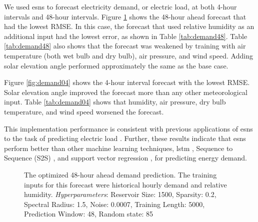 We used \glspl{esn} to forecast electricity demand, or electric load, at both
4-hour intervals and 48-hour intervals. Figure \ref{fig:48demand} shows the
48-hour ahead forecast that had the lowest RMSE. In this case, the forecast
that used relative humidity as an additional input had the lowest error, as
shown in Table \ref{tab:demand48}. Table \ref{tab:demand48} also shows that the
forecast was weakened by training with air temperature (both wet bulb and dry
bulb), air pressure, and wind speed. Adding solar elevation angle performed
approximately the same as the base case.

Figure \ref{fig:demand04} shows the 4-hour interval forecast with the lowest
RMSE. Solar elevation angle improved the
forecast more than any other meteorological input. Table \ref{tab:demand04}
shows that humidity, air pressure, dry bulb temperature, and wind speed
worsened the forecast.

This implementation performance is consistent with previous applications
of \glspl{esn} to the task of predicting electric load
\cite{deihimi_application_2012}. Further, these results indicate that
\glspl{esn} perform better than other machine learning techniques, \gls{lstm}
\cite{marino_building_2016}, Sequence to Sequence (S2S)
\cite{marino_building_2016}, and support vector regression \cite{chen_day-ahead_2017}, for predicting energy demand.

\begin{figure}[H]
  \centering
    \resizebox{\columnwidth}{!}{}
  \caption{The optimized 48-hour ahead demand prediction. The training inputs for this
  forecast were historical hourly demand and relative humidity. \textit{Hyperparameters}:
  Reservoir Size: 1500, Sparsity: 0.2, Spectral Radius: 1.5, Noise: 0.0007,
  Training Length: 5000, Prediction Window: 48, Random state: 85}
  \label{fig:48demand}
\end{figure}

